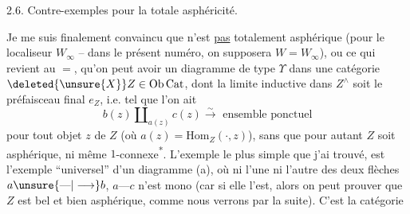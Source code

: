 
2.6. Contre-exemples pour la totale asphéricité.

Je me suis finalement convaincu que
n’est \uline{pas} totalement asphérique (pour le localiseur $W_\infty$ -- dans le présent numéro, on supposera $W=W_\infty$), ou ce qui revient au $=$, qu’on peut avoir un diagramme de type $\Upsilon$
dans une catégorie $\deleted{\unsure{X}}Z\in\mathrm{Ob}\,\mathrm{Cat}$, dont la limite inductive  dans $Z^{\wedge}$ soit le préfaisceau final $e_Z$, i.e. tel que l’on ait
\[
b(z)\amalg_{a(z)}c(z)\overset{\sim}{\longrightarrow}\text{ ensemble ponctuel}
\]
pour tout objet $z$ de $Z$ (où $a(z)=\mathrm{Hom}_{Z}(\cdot,z)$), sans que pour autant $Z$ soit asphérique, ni même $1$-connexe\textsuperscript{*}.
L’exemple le plus simple que j’ai trouvé, est l’exemple ``universel'' d’un diagramme (a), où  ni l’une ni l’autre des deux flèches $a\unsure{\text{---}|\longrightarrow}b$, $a\text{---}c$ n’est mono (car si elle l’est, alors on peut prouver que $Z$ est bel et bien asphérique, comme nous verrons par la suite). C’est la catégorie

